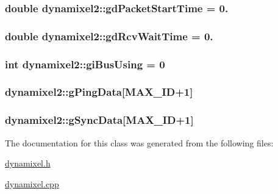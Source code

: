 \subsubsection[{gd\+Packet\+Start\+Time}]{\setlength{\rightskip}{0pt plus 5cm}double dynamixel2\+::gd\+Packet\+Start\+Time = 0.\hspace{0.3cm}{\ttfamily [private]}}\label{classdynamixel2_ac9746f2c7ed6d706152d6d0d502993c0}
\hypertarget{classdynamixel2_ae7b830369861e191120f9b310a68e2d8}{}
\subsubsection[{gd\+Rcv\+Wait\+Time}]{\setlength{\rightskip}{0pt plus 5cm}double dynamixel2\+::gd\+Rcv\+Wait\+Time = 0.\hspace{0.3cm}{\ttfamily [private]}}\label{classdynamixel2_ae7b830369861e191120f9b310a68e2d8}
\hypertarget{classdynamixel2_a7fc43b4c4b7e36aa8f0420b037658f83}{}
\subsubsection[{gi\+Bus\+Using}]{\setlength{\rightskip}{0pt plus 5cm}int dynamixel2\+::gi\+Bus\+Using = 0\hspace{0.3cm}{\ttfamily [private]}}\label{classdynamixel2_a7fc43b4c4b7e36aa8f0420b037658f83}
\hypertarget{classdynamixel2_ae5cf4b09150f4a480ee23279c4e97486}{}
\subsubsection[{g\+Ping\+Data}]{ dynamixel2\+::g\+Ping\+Data\mbox{[}{\bf M\+A\+X\+\_\+\+I\+D}+1\mbox{]}\hspace{0.3cm}{\ttfamily [private]}}\label{classdynamixel2_ae5cf4b09150f4a480ee23279c4e97486}
\hypertarget{classdynamixel2_a5923ec2418ab7ea83cbe365ad8b200d5}{}
\subsubsection[{g\+Sync\+Data}]{ dynamixel2\+::g\+Sync\+Data\mbox{[}{\bf M\+A\+X\+\_\+\+I\+D}+1\mbox{]}\hspace{0.3cm}{\ttfamily [private]}}\label{classdynamixel2_a5923ec2418ab7ea83cbe365ad8b200d5}


The documentation for this class was generated from the following files\+:\begin{DoxyCompactItemize}
\item 
\hyperlink{dynamixel_8h}{dynamixel.\+h}\item 
\hyperlink{dynamixel_8cpp}{dynamixel.\+cpp}\end{DoxyCompactItemize}
